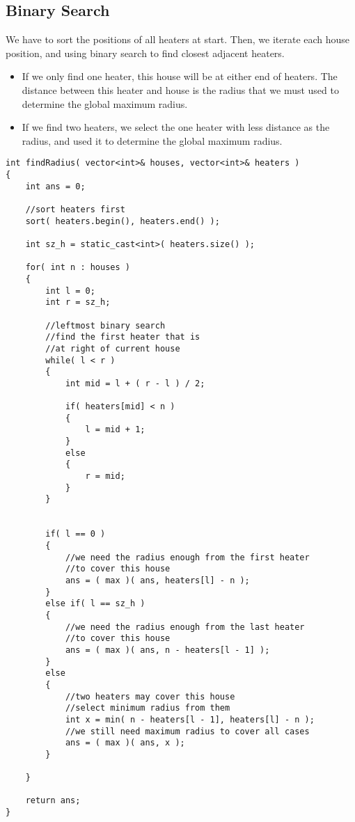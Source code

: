 \subsection{Binary Search}

We have to sort the positions of all heaters at start. Then, we iterate each house position, and using binary search to find closest adjacent heaters. 

\begin{itemize}
\item If we only find one heater, this house will be at either end of heaters. The distance between this heater and house is the radius that we must used to determine the global maximum radius.
\item If we find two heaters, we select the one heater with less distance as the radius, and used it to determine the global maximum radius.
\end{itemize}

\setcounter{lstlisting}{0}
\begin{lstlisting}[style=customc, caption={Binary Search}]
int findRadius( vector<int>& houses, vector<int>& heaters )
{
    int ans = 0;

    //sort heaters first
    sort( heaters.begin(), heaters.end() );

    int sz_h = static_cast<int>( heaters.size() );

    for( int n : houses )
    {
        int l = 0;
        int r = sz_h;

        //leftmost binary search
        //find the first heater that is
        //at right of current house
        while( l < r )
        {
            int mid = l + ( r - l ) / 2;

            if( heaters[mid] < n )
            {
                l = mid + 1;
            }
            else
            {
                r = mid;
            }
        }


        if( l == 0 )
        {
            //we need the radius enough from the first heater
            //to cover this house
            ans = ( max )( ans, heaters[l] - n );
        }
        else if( l == sz_h )
        {
            //we need the radius enough from the last heater
            //to cover this house
            ans = ( max )( ans, n - heaters[l - 1] );
        }
        else
        {
            //two heaters may cover this house
            //select minimum radius from them
            int x = min( n - heaters[l - 1], heaters[l] - n );
            //we still need maximum radius to cover all cases
            ans = ( max )( ans, x );
        }

    }

    return ans;
}
\end{lstlisting}